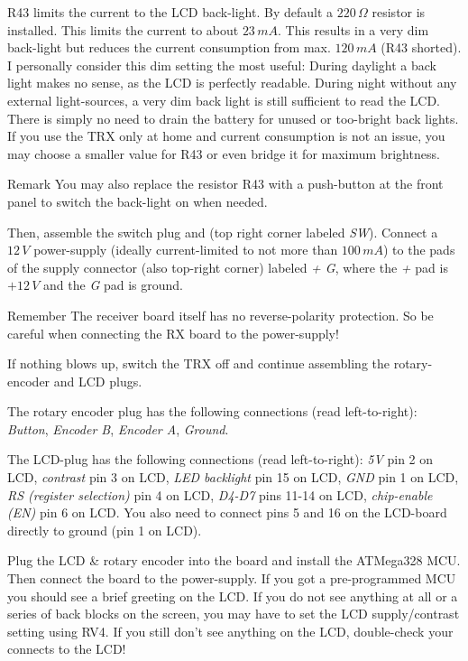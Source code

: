 \documentclass[10pt, a4paper]{scrartcl}
\newenvironment{remember}{\begin{bclogo}[couleur=blue!30,arrondi=.1,logo=\bccrayon,ombre=true]{Remember}}{\end{bclogo}}
\newenvironment{remark}{\begin{bclogo}[couleur=blue!30,arrondi=.1,logo=\bcinfo,ombre=true]{Remark}}{\end{bclogo}}
\begin{document}
 R43 limits the current to the LCD back-light. By default a $220\,\Omega$ resistor is installed. This limits the current to about $23\,mA$. This results in a very dim back-light but reduces the current consumption from max. $120\, mA$ (R43 shorted). I personally consider this dim setting the most useful: During daylight a back light makes no sense, as the LCD is perfectly readable. During night without any external light-sources, a very dim back light is still sufficient to read the LCD. There is simply no need to drain the battery for unused or too-bright back lights. If you use the TRX only at home and current consumption is not an issue, you may choose a smaller value for R43 or even bridge it for maximum brightness.
 
\begin{remark} 
 You may also replace the resistor R43 with a push-button at the front panel to switch the back-light on when needed.
\end{remark}
 
 Then, assemble the switch plug and (top right corner labeled \emph{SW}). Connect a $12\,V$ power-supply (ideally current-limited to not more than $100\,mA$) to the pads of the supply connector (also top-right corner) labeled \emph{+ G}, where the \emph{+} pad is $+12\,V$ and the \emph{G} pad is ground. 

\begin{remember}
 The receiver board itself has no reverse-polarity protection. So be careful when connecting the RX board to the power-supply!
\end{remember}
  
 If nothing blows up, switch the TRX off and continue assembling the rotary-encoder and LCD plugs. 
 
 The rotary encoder plug has the following connections (read left-to-right): \emph{Button}, \emph{Encoder B}, \emph{Encoder A}, \emph{Ground}. 

 The LCD-plug has the following connections (read left-to-right): \emph{5V} pin 2 on LCD, \emph{contrast} pin 3 on LCD, \emph{LED backlight} pin 15 on LCD, \emph{GND} pin 1 on LCD, \emph{RS (register selection)} pin 4 on LCD, \emph{D4-D7} pins 11-14 on LCD, \emph{chip-enable (EN)} pin 6 on LCD. You also need to connect pins 5 and 16 on the LCD-board directly to ground (pin 1 on LCD).
 
 Plug the LCD \& rotary encoder into the board and install the ATMega328 MCU. Then connect the board to the power-supply. If you got a pre-programmed MCU you should see a brief greeting on the LCD. If you do not see anything at all or a series of back blocks on the screen, you may have to set the LCD supply/contrast setting using RV4. If you still don't see anything on the LCD, double-check your connects to the LCD! 
\end{document}
